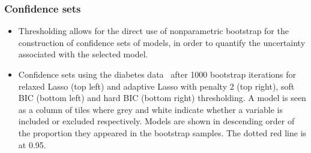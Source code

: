 \documentclass{beamer}
\begin{document}
\begin{frame}
  \frametitle{Confidence sets}
  \begin{itemize}
  \item Thresholding allows for the direct use of nonparametric bootstrap for the construction of confidence sets of models, in order to quantify the uncertainty associated with the selected model.
  \item   Confidence sets using the diabetes data~\citep{smith:1988} after 1000 bootstrap iterations for relaxed Lasso (top left) and adaptive Lasso with penalty 2 (top right), soft BIC (bottom left) and hard BIC (bottom right) thresholding. A model is seen as a column of tiles where grey and white indicate whether a variable is included or excluded respectively. Models are shown in descending order of the proportion they appeared in the bootstrap samples.  The dotted red line is at 0.95.
  \end{itemize}
\end{frame}
\end{document}

